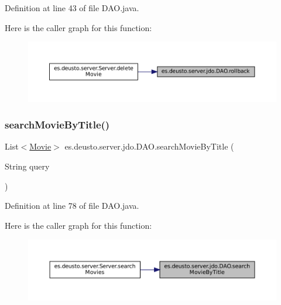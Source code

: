 Definition at line 43 of file D\+A\+O.\+java.

Here is the caller graph for this function\+:
\nopagebreak
\begin{figure}[H]
\begin{center}
\leavevmode
\includegraphics[width=350pt]{classes_1_1deusto_1_1server_1_1jdo_1_1_d_a_o_ac2a137746dce274ba0a89eb388820bcf_icgraph}
\end{center}
\end{figure}
\mbox{\label{classes_1_1deusto_1_1server_1_1jdo_1_1_d_a_o_a58c4f711e3e60688619f8a065073f4ff}} 
\subsubsection{\texorpdfstring{searchMovieByTitle()}{searchMovieByTitle()}}
{\footnotesize\ttfamily List$<$\mbox{\hyperlink{classes_1_1deusto_1_1server_1_1jdo_1_1_movie}{Movie}}$>$ es.\+deusto.\+server.\+jdo.\+D\+A\+O.\+search\+Movie\+By\+Title (\begin{DoxyParamCaption}\item[{String}]{query }\end{DoxyParamCaption})}



Definition at line 78 of file D\+A\+O.\+java.

Here is the caller graph for this function\+:
\nopagebreak
\begin{figure}[H]
\begin{center}
\leavevmode
\includegraphics[width=350pt]{classes_1_1deusto_1_1server_1_1jdo_1_1_d_a_o_a58c4f711e3e60688619f8a065073f4ff_icgraph}
\end{center}
\end{figure}
\mbox{\label{classes_1_1deusto_1_1server_1_1jdo_1_1_d_a_o_a663255898c034b46536c8a9cd2b247f9}} 
